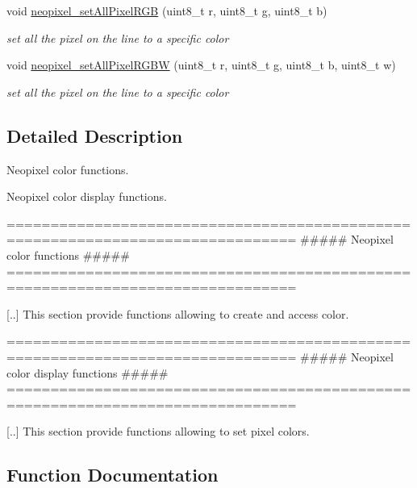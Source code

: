 \begin{DoxyCompactItemize}
void \hyperlink{group___neopixel_ga7a6c2dc149e86a788aede1d6aa5262d7}{neopixel\+\_\+set\+All\+Pixel\+R\+GB} (uint8\+\_\+t r, uint8\+\_\+t g, uint8\+\_\+t b)
\begin{DoxyCompactList}\small\item\em set all the pixel on the line to a specific color \end{DoxyCompactList}\item 
void \hyperlink{group___neopixel_ga1ba017c1f338ef2c8e4a48acae35d87e}{neopixel\+\_\+set\+All\+Pixel\+R\+G\+BW} (uint8\+\_\+t r, uint8\+\_\+t g, uint8\+\_\+t b, uint8\+\_\+t w)
\begin{DoxyCompactList}\small\item\em set all the pixel on the line to a specific color \end{DoxyCompactList}\end{DoxyCompactItemize}


\subsection{Detailed Description}
Neopixel color functions. 

Neopixel color display functions.

\begin{DoxyVerb} ===============================================================================
         ##### Neopixel color functions #####
 ===============================================================================

 [..] This section provide functions allowing to create and access color.\end{DoxyVerb}


\begin{DoxyVerb} ===============================================================================
         ##### Neopixel color display functions #####
 ===============================================================================

 [..] This section provide functions allowing to set pixel colors.\end{DoxyVerb}
 

\subsection{Function Documentation}
\mbox{\label{group___neopixel_ga40253bdc59873753452f3179a8ee1762}} 
